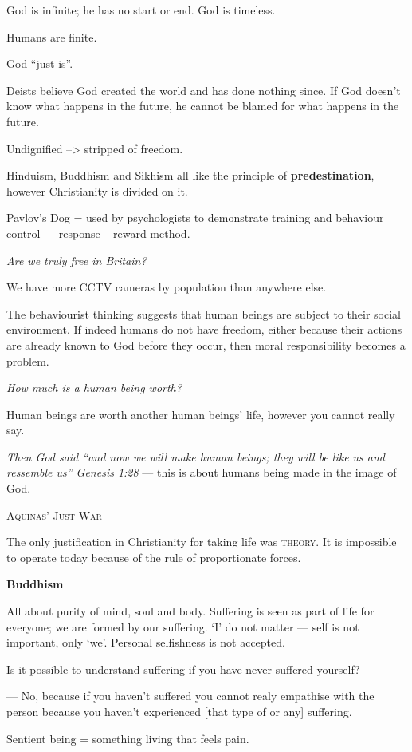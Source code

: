 \documentclass{article}
\begin{document}
God is infinite; he has no start or end.  God is timeless.

Humans are finite.

God ``just is''.

Deists believe God created the world and has done nothing since.  If God doesn't know what happens in the future, he cannot be blamed for what happens in the future.

Undignified --> stripped of freedom.

Hinduism, Buddhism and Sikhism all like the principle of \textbf{predestination}, however Christianity is divided on it.

Pavlov's Dog = used by psychologists to demonstrate training and behaviour control --- response -- reward method.

\textit{Are we truly free in Britain?}

We have more CCTV cameras by population than anywhere else.

The behaviourist thinking suggests that human beings are subject to their social environment.  If indeed humans do not have freedom, either because their actions are already known to God before they occur, then moral responsibility becomes a problem.

\textit{How much is a human being worth?}

Human beings are worth another human beings' life, however you cannot really say.

\textsl{Then God said ``and now we will make human beings; they will be like us and ressemble us'' Genesis 1:28} --- this is about humans being made in the image of God.

\textsc{Aquinas' Just War}

The only justification in Christianity for taking life was \textsc{theory}.  It is impossible to operate today because of the rule of proportionate forces.

\textbf{Buddhism}

All about purity of mind, soul and body.  Suffering is seen as part of life for everyone; we are formed by our suffering.  `I' do not matter --- self is not important, only `we'.  Personal selfishness is not accepted.

Is it possible to understand suffering if you have never suffered yourself?

--- No, because if you haven't suffered you cannot realy empathise with the person because you haven't experienced [that type of or any] suffering.

Sentient being = something living that feels pain.
\end{document}
